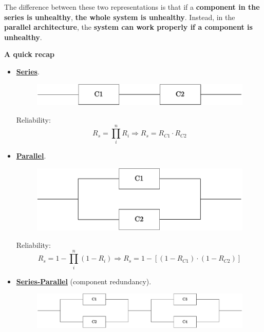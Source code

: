 The difference between these two representations is that if a \textbf{component in the series is unhealthy}, \textbf{the whole system is unhealthy}. Instead, in the \textbf{parallel architecture}, the \textbf{system can work properly if a component is unhealthy}.

\newpage

\begin{flushleft}
    \textcolor{Green3}{ \textbf{A quick recap}}
\end{flushleft}
\begin{itemize}
    \item \underline{\textbf{Series}}.
    \begin{figure}[!htp]
        \centering
        \includegraphics[width=.6\textwidth]{img/RBD-1.pdf}
    \end{figure}

    Reliability:
    \begin{equation*}
        R_{s} = \displaystyle\prod_{i}^{n} R_{i} \Longrightarrow R_{s} = R_{C1} \cdot R_{C2}
    \end{equation*}
    

    \item \underline{\textbf{Parallel}}.
    \begin{figure}[!htp]
        \centering
        \includegraphics[width=.6\textwidth]{img/RBD-2.pdf}
    \end{figure}

    Reliability:
    \begin{equation*}
        R_{s} = 1 - \displaystyle\prod_{i}^{n} \left(1 - R_{i}\right) \Longrightarrow R_{s} = 1 - \left[\left(1 - R_{C1}\right) \cdot \left(1 - R_{C2}\right)\right]
    \end{equation*}


    \item \underline{\textbf{Series-Parallel}} (component redundancy).
    \begin{figure}[!htp]
        \centering
        \includegraphics[width=\textwidth]{img/RBD-3.pdf}
    \end{figure}


\end{itemize}
